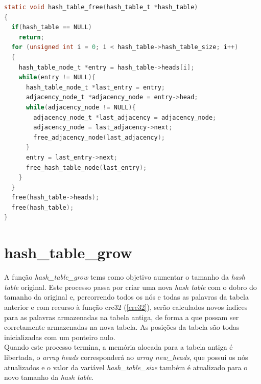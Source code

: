 	\begin{lstlisting}[language=C]
static void hash_table_free(hash_table_t *hash_table)
{
  if(hash_table == NULL)
    return;
  for (unsigned int i = 0; i < hash_table->hash_table_size; i++)
  {
    hash_table_node_t *entry = hash_table->heads[i];
    while(entry != NULL){
      hash_table_node_t *last_entry = entry;
      adjacency_node_t *adjacency_node = entry->head;
      while(adjacency_node != NULL){
        adjacency_node_t *last_adjacency = adjacency_node;
        adjacency_node = last_adjacency->next;
        free_adjacency_node(last_adjacency);
      }
      entry = last_entry->next;
      free_hash_table_node(last_entry); 
    }
  }
  free(hash_table->heads);
  free(hash_table);
}	
	\end{lstlisting}
	
	\section{hash\_table\_grow}
	\label{hashtablegrow}
A função \textit{hash\_table\_grow} tems como objetivo aumentar o tamanho da \textit{hash table} original. Este processo passa por criar uma nova \textit{hash table} com o dobro do tamanho da original e, percorrendo todos os nós e todas as palavras da tabela anterior e com recurso à função crc32 (\ref{crc32}), serão calculados novos índices para as palavras armazenadas na tabela antiga, de forma a que possam ser corretamente armazenadas na nova tabela. As posições da tabela são todas inicializadas com um ponteiro nulo.
\\
Quando este processo termina, a memória alocada para a tabela antiga é libertada, o \textit{array heads} corresponderá ao \textit{array new\_heads}, que possui os nós atualizados e o valor da variável \textit{hash\_table\_size} também é atualizado para o novo tamanho da \textit{hash table}.\\

